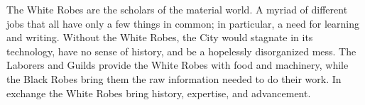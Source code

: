 The White Robes are the scholars of the material world. A myriad of different jobs that all have only a few things in common; in particular, a need for learning and writing. Without the White Robes, the City would stagnate in its technology, have no sense of history, and be a hopelessly disorganized mess. The Laborers and Guilds provide the White Robes with food and machinery, while the Black Robes bring them the raw information needed to do their work. In exchange the White Robes bring history, expertise, and advancement.